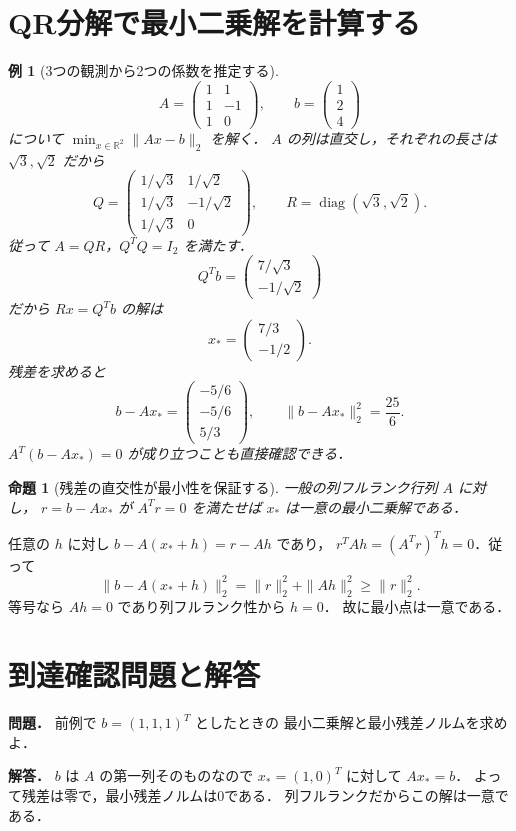 \documentclass[a5paper,10pt,onecolumn]{jsarticle}
\makeatletter
\theoremstyle{mathnotetheorem}
\newtheorem{proposition}[theorem]{命題}
\newtheorem{example}[theorem]{例}
\renewcommand{\proofname}{証明}
\renewenvironment{proof}[1][\proofname]{%
  \par\pushQED{\qed}\normalfont\topsep4\p@\@plus2\p@\relax
  \trivlist\item[\hskip\labelsep\bfseries #1]\ignorespaces
}{\popQED\endtrivlist\@endpefalse}
\makeatother
\begin{document}
\section{QR分解で最小二乗解を計算する}
\begin{example}[3つの観測から2つの係数を推定する]
\[
 A=\begin{pmatrix}1&1\\1&-1\\1&0\end{pmatrix},
 \qquad b=\begin{pmatrix}1\\2\\4\end{pmatrix}
\]
について $\min_{x\in\mathbb R^2}\|Ax-b\|_2$ を解く．
$A$ の列は直交し，それぞれの長さは
$\sqrt3,\sqrt2$ だから
\[
 Q=\begin{pmatrix}1/\sqrt3&1/\sqrt2\\
                   1/\sqrt3&-1/\sqrt2\\
                   1/\sqrt3&0\end{pmatrix},\qquad
 R=\operatorname{diag}(\sqrt3,\sqrt2).
\]
従って $A=QR$，$Q^TQ=I_2$ を満たす．
\[
 Q^Tb=\begin{pmatrix}7/\sqrt3\\-1/\sqrt2\end{pmatrix}
\]
だから $Rx=Q^Tb$ の解は
\[
 x_*=\begin{pmatrix}7/3\\-1/2\end{pmatrix}.
\]
残差を求めると
\[
 b-Ax_*=
 \begin{pmatrix}-5/6\\-5/6\\5/3\end{pmatrix},
 \qquad
 \|b-Ax_*\|_2^2=\frac{25}{6}.
\]
$A^T(b-Ax_*)=0$ が成り立つことも直接確認できる．
\end{example}
\begin{proposition}[残差の直交性が最小性を保証する]
一般の列フルランク行列 $A$ に対し，
$r=b-Ax_*$ が $A^Tr=0$ を満たせば
$x_*$ は一意の最小二乗解である．
\end{proposition}
\begin{proof}
任意の $h$ に対し $b-A(x_*+h)=r-Ah$ であり，
$r^TAh=(A^Tr)^Th=0$．従って
\[
 \|b-A(x_*+h)\|_2^2
 =\|r\|_2^2+\|Ah\|_2^2\ge\|r\|_2^2.
\]
等号なら $Ah=0$ であり列フルランク性から $h=0$．
故に最小点は一意である．
\end{proof}
\section*{到達確認問題と解答}
\noindent\textbf{問題．}
前例で $b=(1,1,1)^T$ としたときの
最小二乗解と最小残差ノルムを求めよ．

\medskip\noindent\textbf{解答．}
$b$ は $A$ の第一列そのものなので
$x_*=(1,0)^T$ に対して $Ax_*=b$．
よって残差は零で，最小残差ノルムは0である．
列フルランクだからこの解は一意である．
\end{document}
